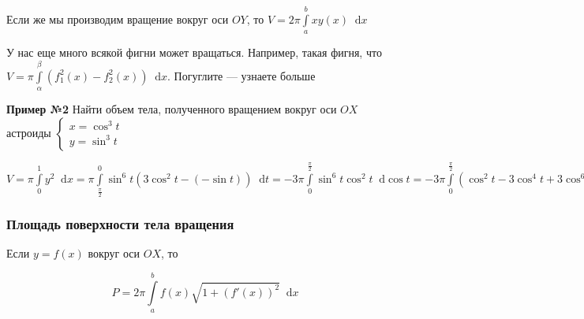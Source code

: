 \documentclass{article}
\newcommand*\diff{\mathop{}\!\mathrm{d}}
\begin{document}
\hfill

Если же мы производим вращение вокруг оси $OY$, то $V = 2 \pi \int\limits_{a}^{b} x y(x) \diff x$

У нас еще много всякой фигни может вращаться. Например, такая фигня, что $V = \pi \int\limits_{\alpha}^{\beta} (f_1^2 (x) - f_2^2 (x)) \diff x$. Погуглите — узнаете больше

\hfill

\textbf{Пример №2} Найти объем тела, полученного вращением вокруг оси $OX$ астроиды $\begin{cases}
    x = \cos^3 t \\
    y = \sin^3 t
\end{cases}$

$V = \pi \int\limits_{0}^{1} y^2 \diff x = \pi \int\limits_{\frac{\pi}{2}}^{0} \sin^6 t (3 \cos^2 t - (-\sin t)) \diff t = -3 \pi \int\limits_{0}^{\frac{\pi}{2}} \sin^6 t \cos^2 t \diff \cos t = - 3 \pi \int\limits_{0}^{\frac{\pi}{2}} (\cos^2 t - 3 \cos^4 t + 3 \cos^6 t - \cos^8 t) \diff \cos t = -\frac{\cos^9 t}{9} - \frac{\cos^3 t}{3} - \frac{3\cos^5 t}{5} + \frac{3 \cos^7 t}{7} \bigg|_{0}^{\frac{\pi}{2}} = \dots$

\subsubsection{Площадь поверхности тела вращения}

Если $y = f(x)$ вокруг оси $OX$, то

$$P = 2 \pi \int\limits_{a}^{b} f(x) \sqrt{1 + (f'(x))^2} \diff x$$
\end{document}
